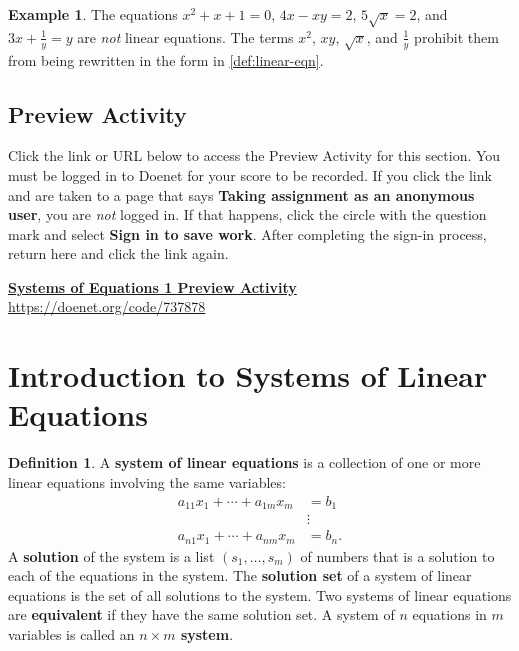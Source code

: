 \documentclass{article}
\theoremstyle{definition}
\newtheorem{definition}{Definition}
\newtheorem{example}{Example}
\newcommand{\doenetlink}[2]{%
    \begin{tcolorbox}[
        colback=gray!6,
        colframe=blue!60!black,
        boxrule=0pt,
        leftrule=3pt,
        arc=2pt,
        left=8pt, right=8pt, top=6pt, bottom=6pt,
        before skip=10pt, after skip=10pt
    ]
    \textbf{\href{#2}{#1}} \\
    {\small\ttfamily \url{#2}}
    \end{tcolorbox}%
}
\begin{document}
\begin{example}\label{ex:linear-eqn-non}
The equations \(x^2+x+1=0\), \(4x-xy=2\), \(5\sqrt{x}=2\), and \(3x+\frac{1}{y}=y\) are \textit{not} linear equations. The terms \(x^2\), \(xy\), \(\sqrt{x}\), and \(\frac{1}{y}\) prohibit them from being rewritten in the form in \cref{def:linear-eqn}.
\end{example}

\subsection*{Preview Activity}\label{subsec:preview}

Click the link or URL below to access the Preview Activity for this section. You must be logged in to Doenet for your score to be recorded. If you click the link and are taken to a page that says \textbf{Taking assignment as an anonymous user}, you are \textit{not} logged in. If that happens, click the circle with the question mark and select \textbf{Sign in to save work}. After completing the sign-in process, return here and click the link again.

\doenetlink{Systems of Equations 1 Preview Activity}{https://doenet.org/code/737878}


\section{Introduction to Systems of Linear Equations}\label{sec:systems}

\begin{definition}
A \textbf{system of linear equations} is a collection of one or more linear equations involving the same variables:
\begin{align*}
    a_{11}x_1+\cdots+a_{1m}x_m&=b_1 \\
    &\vdots \\
    a_{n1}x_1+\cdots+a_{nm}x_m&=b_n.
\end{align*}
A \textbf{solution} of the system is a list \((s_1, \ldots, s_m)\) of numbers that is a solution to each of the equations in the system. The \textbf{solution set} of a system of linear equations is the set of all solutions to the system. Two systems of linear equations are \textbf{equivalent} if they have the same solution set. A system of \(n\) equations in \(m\) variables is called an \textbf{\(n \times m\) system}.
\end{definition}
\end{document}
